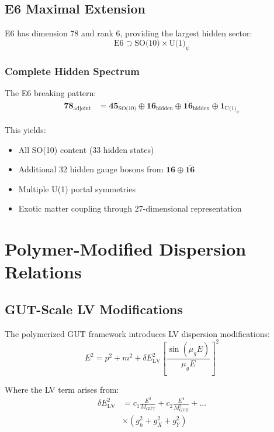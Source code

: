 \documentclass[11pt]{article}
\begin{document}
\subsection{E6 Maximal Extension}

E6 has dimension 78 and rank 6, providing the largest hidden sector:
\begin{equation}
\text{E6} \supset \text{SO(10)} \times \text{U(1)}_\psi
\end{equation}

\subsubsection{Complete Hidden Spectrum}

The E6 breaking pattern:
\begin{align}
\mathbf{78}_{\text{adjoint}} &= \mathbf{45}_{\text{SO(10)}} \oplus \mathbf{16}_{\text{hidden}} \oplus \mathbf{\overline{16}}_{\text{hidden}} \oplus \mathbf{1}_{\text{U(1)}_\psi}
\end{align}

This yields:
\begin{itemize}
    \item All SO(10) content (33 hidden states)
    \item Additional 32 hidden gauge bosons from $\mathbf{16} \oplus \mathbf{\overline{16}}$
    \item Multiple U(1) portal symmetries
    \item Exotic matter coupling through 27-dimensional representation
\end{itemize}

\section{Polymer-Modified Dispersion Relations}

\subsection{GUT-Scale LV Modifications}

The polymerized GUT framework introduces LV dispersion modifications:
\begin{equation}
\boxed{
E^2 = p^2 + m^2 + \delta E^2_{\text{LV}} \left[\frac{\sin(\mu_g E)}{\mu_g E}\right]^2
}
\end{equation}

Where the LV term arises from:
\begin{align}
\delta E^2_{\text{LV}} &= c_1 \frac{E^3}{M_{\text{GUT}}} + c_2 \frac{E^4}{M_{\text{GUT}}^2} + \ldots \\
&\times \left(g_h^2 + g_X^2 + g_Y^2\right)
\end{align}
\end{document}
